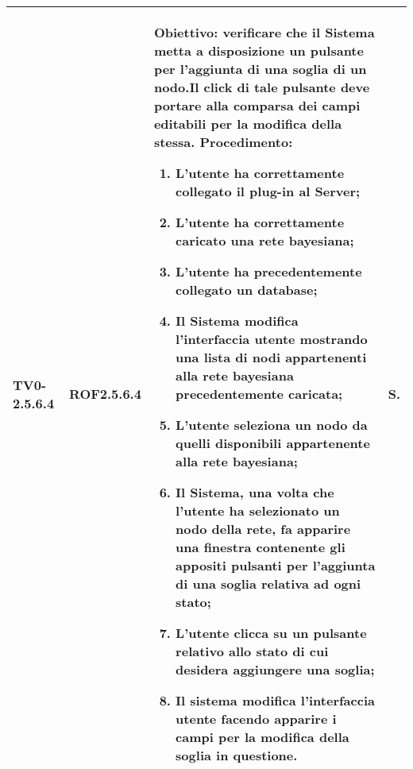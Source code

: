 \begin{longtable}{|C{.15\textwidth}|C{.13\textwidth}|m{.65\textwidth}|C{.08\textwidth}|}
TV0-2.5.6.4 & ROF2.5.6.4  &
	\textbf{Obiettivo}: verificare che il Sistema metta a disposizione un pulsante per l'aggiunta di una soglia di un nodo.Il click di tale pulsante deve portare alla comparsa dei campi editabili per la modifica della stessa. \newline
	\textbf{Procedimento}:
	\begin{enumerate}
		\item L'utente ha correttamente collegato il plug-in al Server;
		\item L'utente ha correttamente caricato una rete bayesiana;
		\item L'utente ha precedentemente collegato un database;
		\item Il Sistema modifica l'interfaccia utente mostrando una lista di nodi appartenenti alla rete bayesiana precedentemente caricata;
		\item L'utente seleziona un nodo da quelli disponibili appartenente alla rete bayesiana;
		\item Il Sistema, una volta che l'utente ha selezionato un nodo della rete, fa apparire una finestra contenente gli appositi pulsanti per l'aggiunta di una soglia relativa ad ogni stato;
		\item L'utente clicca su un pulsante relativo allo stato di cui desidera aggiungere una soglia;
		\item Il sistema modifica l'interfaccia utente facendo apparire i campi per la modifica della soglia in questione.
	\end{enumerate}
	& S. \\
\hline


\end{longtable}
